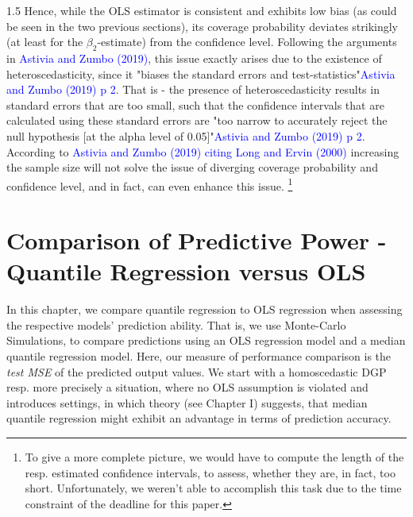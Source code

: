 \documentclass[conference]{IEEEtran}
\begin{document}
\begin{spacing}{1.5}
Hence, while the OLS estimator is consistent and exhibits low bias (as could be seen in the two previous sections), its coverage probability deviates strikingly (at least for the $\beta_{2}$-estimate) from the confidence level. 
Following the arguments in \textcolor{blue}{Astivia and Zumbo (2019)}, this issue exactly arises due to the existence of heteroscedasticity, since it "biases the standard errors and test-statistics"\textcolor{blue}{Astivia and Zumbo (2019) p 2}. That is - the presence of heteroscedasticity results in standard errors that are too small, such that the confidence intervals that are calculated using these standard errors are "too narrow to accurately reject the null hypothesis [at the alpha level of 0.05]"\textcolor{blue}{Astivia and Zumbo (2019) p 2}. According to \textcolor{blue}{Astivia and Zumbo (2019) citing Long and Ervin (2000)} increasing the sample size will not solve the issue of diverging coverage probability and confidence level, and in fact, can even enhance this issue.
\footnote{To give a more complete picture, we would have to compute the length of the resp. estimated confidence intervals, to assess, whether they are, in fact, too short. Unfortunately, we weren't able to accomplish this task due to the time constraint of the deadline for this paper.}

\section{\textbf{Comparison of Predictive Power - Quantile Regression versus OLS}}
In this chapter, we compare quantile regression to OLS regression when assessing the respective models' prediction ability. That is, we use Monte-Carlo Simulations, to compare predictions using an OLS regression model and a median quantile regression model. Here, our measure of performance comparison is the \textit{test MSE} of the predicted output values. We start with a homoscedastic DGP resp. more precisely a situation, where no OLS assumption is violated and introduces settings, in which theory (see Chapter I) suggests, that median quantile regression might exhibit an advantage in terms of prediction accuracy.

\end{spacing}
\end{document}
